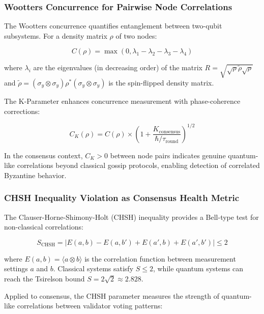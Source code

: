 \documentclass[11pt,a4paper]{article}
\begin{document}
\subsubsection{Wootters Concurrence for Pairwise Node Correlations}

The Wootters concurrence \cite{wootters1998} quantifies entanglement between two-qubit subsystems. For a density matrix $\rho$ of two nodes:

\begin{equation}
C(\rho) = \max(0, \lambda_1 - \lambda_2 - \lambda_3 - \lambda_4)
\label{eq:wootters-concurrence}
\end{equation}

where $\lambda_i$ are the eigenvalues (in decreasing order) of the matrix $R = \sqrt{\sqrt{\rho}\tilde{\rho}\sqrt{\rho}}$ and $\tilde{\rho} = (\sigma_y \otimes \sigma_y)\rho^*(\sigma_y \otimes \sigma_y)$ is the spin-flipped density matrix.

The K-Parameter enhances concurrence measurement with phase-coherence corrections:

\begin{equation}
C_K(\rho) = C(\rho) \times \left(1 + \frac{K_{\text{consensus}}}{\hbar/\tau_{\text{round}}}\right)^{1/2}
\end{equation}

In the consensus context, $C_K > 0$ between node pairs indicates genuine quantum-like correlations beyond classical gossip protocols, enabling detection of correlated Byzantine behavior.

\subsubsection{CHSH Inequality Violation as Consensus Health Metric}

The Clauser-Horne-Shimony-Holt (CHSH) inequality \cite{clauser1969} provides a Bell-type test for non-classical correlations:

\begin{equation}
S_{\text{CHSH}} = |E(a,b) - E(a,b') + E(a',b) + E(a',b')| \leq 2
\label{eq:chsh}
\end{equation}

where $E(a,b) = \langle a \otimes b \rangle$ is the correlation function between measurement settings $a$ and $b$. Classical systems satisfy $S \leq 2$, while quantum systems can reach the Tsirelson bound $S = 2\sqrt{2} \approx 2.828$.

Applied to consensus, the CHSH parameter measures the strength of quantum-like correlations between validator voting patterns:
\end{document}
